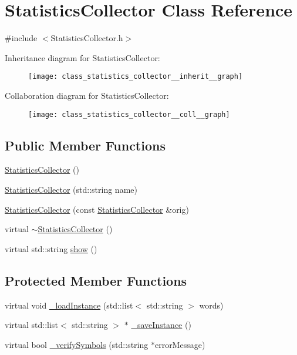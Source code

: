\hypertarget{class_statistics_collector}{\section{Statistics\-Collector Class Reference}
\label{class_statistics_collector}
}


{\ttfamily \#include $<$Statistics\-Collector.\-h$>$}



Inheritance diagram for Statistics\-Collector\-:\nopagebreak
\begin{figure}[H]
\begin{center}
\leavevmode
\texttt{[image: class\_statistics\_collector\_\_inherit\_\_graph]}
\end{center}
\end{figure}


Collaboration diagram for Statistics\-Collector\-:\nopagebreak
\begin{figure}[H]
\begin{center}
\leavevmode
\texttt{[image: class\_statistics\_collector\_\_coll\_\_graph]}
\end{center}
\end{figure}
\subsection*{Public Member Functions}
\begin{DoxyCompactItemize}
\item 
\hyperlink{class_statistics_collector_a2129c2bd19f9d64814fbfe18974a6d2e}{Statistics\-Collector} ()
\item 
\hyperlink{class_statistics_collector_acbb20e7e94252ff7105de7b0cdecb7ee}{Statistics\-Collector} (std\-::string name)
\item 
\hyperlink{class_statistics_collector_a25e8def6d91decdf48d7c0fedb4382dc}{Statistics\-Collector} (const \hyperlink{class_statistics_collector}{Statistics\-Collector} \&orig)
\item 
virtual \hyperlink{class_statistics_collector_aef9244a0c9f715bc19136d283b759c6e}{$\sim$\-Statistics\-Collector} ()
\item 
virtual std\-::string \hyperlink{class_statistics_collector_a7ce8dad7e29d06c73a01d2ddee93fe00}{show} ()
\end{DoxyCompactItemize}
\subsection*{Protected Member Functions}
\begin{DoxyCompactItemize}
\item 
virtual void \hyperlink{class_statistics_collector_aa13d2bc6d9deeffa9667388ae3e4f962}{\-\_\-load\-Instance} (std\-::list$<$ std\-::string $>$ words)
\item 
virtual std\-::list$<$ std\-::string $>$ $\ast$ \hyperlink{class_statistics_collector_a66eed8e1bd0316588575aa7310ac028b}{\-\_\-save\-Instance} ()
\item 
virtual bool \hyperlink{class_statistics_collector_a5aeefa5028a2b6a0157db55c0dfc7419}{\-\_\-verify\-Symbols} (std\-::string $\ast$error\-Message)
\end{DoxyCompactItemize}
